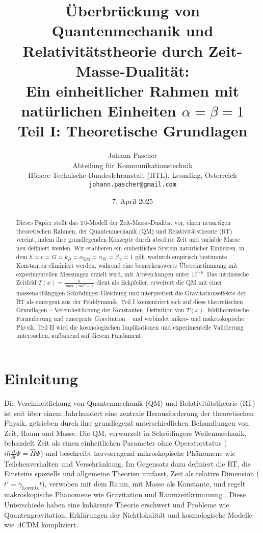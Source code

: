 \documentclass[12pt,a4paper]{article}
\title{Überbrückung von Quantenmechanik und Relativitätstheorie durch Zeit-Masse-Dualität: \\ Ein einheitlicher Rahmen mit natürlichen Einheiten \(\alpha = \beta = 1\) \\ Teil I: Theoretische Grundlagen}
\author{Johann Pascher\\
	Abteilung für Kommunikationstechnik\\
	Höhere Technische Bundeslehranstalt (HTL), Leonding, Österreich\\
	\texttt{johann.pascher@gmail.com}}
\date{7. April 2025}
\newcommand{\Tfield}{T(x)}
\newcommand{\alphaEM}{\alpha_{\text{EM}}}
\newcommand{\alphaW}{\alpha_{\text{W}}}
\newcommand{\betaT}{\beta_{\text{T}}}
\newcommand{\gammaf}{\gamma_{\text{Lorentz}}}
\begin{document}
	
	\maketitle
	
	\begin{abstract}
		Dieses Papier stellt das T0-Modell der Zeit-Masse-Dualität vor, einen neuartigen theoretischen Rahmen, der Quantenmechanik (QM) und Relativitätstheorie (RT) vereint, indem ihre grundlegenden Konzepte durch absolute Zeit und variable Masse neu definiert werden. Wir etablieren ein einheitliches System natürlicher Einheiten, in dem \(\hbar = c = G = k_B = \alphaEM = \alphaW = \betaT = 1\) gilt, wodurch empirisch bestimmte Konstanten eliminiert werden, während eine bemerkenswerte Übereinstimmung mit experimentellen Messungen erzielt wird, mit Abweichungen unter \(10^{-6}\). Das intrinsische Zeitfeld \(\Tfield = \frac{\hbar}{\max(mc^2, \omega)}\) dient als Eckpfeiler, erweitert die QM mit einer massenabhängigen Schrödinger-Gleichung und interpretiert die Gravitationseffekte der RT als emergent aus der Felddynamik. Teil I konzentriert sich auf diese theoretischen Grundlagen – Vereinheitlichung der Konstanten, Definition von \(\Tfield\), feldtheoretische Formulierung und emergente Gravitation – und verbindet mikro- und makroskopische Physik. Teil II wird die kosmologischen Implikationen und experimentelle Validierung untersuchen, aufbauend auf diesem Fundament.
	\end{abstract}
	
	\section{Einleitung}
	\label{sec:introduction}
	
	Die Vereinheitlichung von Quantenmechanik (QM) und Relativitätstheorie (RT) ist seit über einem Jahrhundert eine zentrale Herausforderung der theoretischen Physik, getrieben durch ihre grundlegend unterschiedlichen Behandlungen von Zeit, Raum und Masse. Die QM, verwurzelt in Schrödingers Wellenmechanik, behandelt Zeit als einen einheitlichen Parameter ohne Operatorstatus (\(i\hbar \frac{\partial}{\partial t}\Psi = \hat{H}\Psi\)) \cite{schrodinger1926} und beschreibt hervorragend mikroskopische Phänomene wie Teilchenverhalten und Verschränkung. Im Gegensatz dazu definiert die RT, die Einsteins spezielle und allgemeine Theorien umfasst, Zeit als relative Dimension (\(t' = \gammaf t\)), verwoben mit dem Raum, mit Masse als Konstante, und regelt makroskopische Phänomene wie Gravitation und Raumzeitkrümmung \cite{einstein1905,einstein1915}. Diese Unterschiede haben eine kohärente Theorie erschwert und Probleme wie Quantengravitation, Erklärungen der Nichtlokalität \cite{bell1964} und kosmologische Modelle wie \(\Lambda\)CDM \cite{Planck2020} kompliziert.
	
\end{document}
